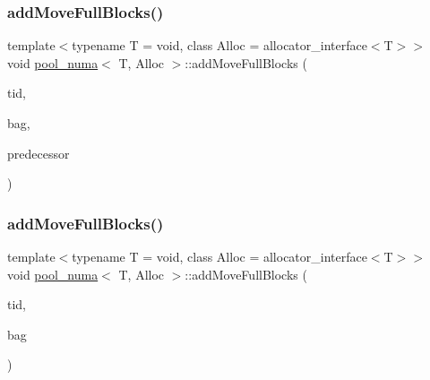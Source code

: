 \mbox{\label{classpool__numa_a3d31aedd219ebb03bedb25cd375781e8}} 
\subsubsection{\texorpdfstring{add\+Move\+Full\+Blocks()}{addMoveFullBlocks()}\hspace{0.1cm}{\footnotesize\ttfamily [1/2]}}
{\footnotesize\ttfamily template$<$typename T  = void, class Alloc  = allocator\+\_\+interface$<$\+T$>$$>$ \\
void \hyperlink{classpool__numa}{pool\+\_\+numa}$<$ T, Alloc $>$\+::add\+Move\+Full\+Blocks (\begin{DoxyParamCaption}\item[{const int}]{tid,  }\item[{\hyperlink{classblockbag}{blockbag}$<$ T $>$ $\ast$}]{bag,  }\item[{\hyperlink{classblock}{block}$<$ T $>$ $\ast$const}]{predecessor }\end{DoxyParamCaption})\hspace{0.3cm}{\ttfamily [inline]}}

\mbox{\label{classpool__numa_aa6eb3d3d60e8da2ea2ef0adc499e5921}} 
\subsubsection{\texorpdfstring{add\+Move\+Full\+Blocks()}{addMoveFullBlocks()}\hspace{0.1cm}{\footnotesize\ttfamily [2/2]}}
{\footnotesize\ttfamily template$<$typename T  = void, class Alloc  = allocator\+\_\+interface$<$\+T$>$$>$ \\
void \hyperlink{classpool__numa}{pool\+\_\+numa}$<$ T, Alloc $>$\+::add\+Move\+Full\+Blocks (\begin{DoxyParamCaption}\item[{const int}]{tid,  }\item[{\hyperlink{classblockbag}{blockbag}$<$ T $>$ $\ast$}]{bag }\end{DoxyParamCaption})\hspace{0.3cm}{\ttfamily [inline]}}

